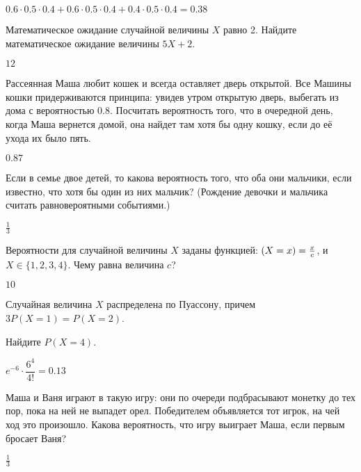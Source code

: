 \documentclass[12pt, addpoints, answers]{exam} %
\let\P\relax
\DeclareMathOperator{\P}{\mathbb{P}}
\begin{document}
\begin{questions}
\begin{solution}
 $0.6\cdot0.5\cdot0.4 + 0.6\cdot0.5\cdot0.4+0.4\cdot0.5\cdot0.4=0.38$
\end{solution}

\question Математическое ожидание случайной величины $X$ равно 2. Найдите математическое ожидание величины $5X + 2$.

\begin{solution}
 $12$
\end{solution}



\question Рассеянная Маша любит кошек и всегда оставляет дверь открытой. Все Машины кошки придерживаются принципа: увидев утром открытую дверь, выбегать из дома с вероятностью $0.8$. Посчитать вероятность того, что в очередной день, когда Маша вернется домой, она найдет там хотя бы одну кошку, если до её ухода их было пять.


\begin{solution}
 $0.87$
\end{solution}



\question Если в семье двое детей, то какова вероятность того, что оба они мальчики, если известно, что хотя бы один из них мальчик? (Рождение девочки и мальчика считать равновероятными событиями.)


\begin{solution}
 $\frac{1}{3}$
\end{solution}

\question Вероятности для  случайной величины $X$ заданы функцией: $\P(X=x) = \frac{x}{c}$, и $X \in \{1,2,3,4\}$. Чему равна величина $c$?

\begin{solution}
 $10$
\end{solution}


\question Случайная величина $X$ распределена по Пуассону, причем $3P(X=1) = P(X=2)$.

Найдите $P(X=4)$.

\begin{solution}
 $e^{-6}\cdot\dfrac{6^4}{4!}=0.13$
\end{solution}


\question Маша и Ваня играют в такую игру: они по очереди подбрасывают монетку до тех пор, пока на ней не выпадет орел. Победителем объявляется тот игрок, на чей ход это произошло. Какова вероятность, что игру выиграет Маша, если первым бросает Ваня?


\begin{solution}
 $\frac{1}{3}$
\end{solution}


\end{questions}
\end{document}

